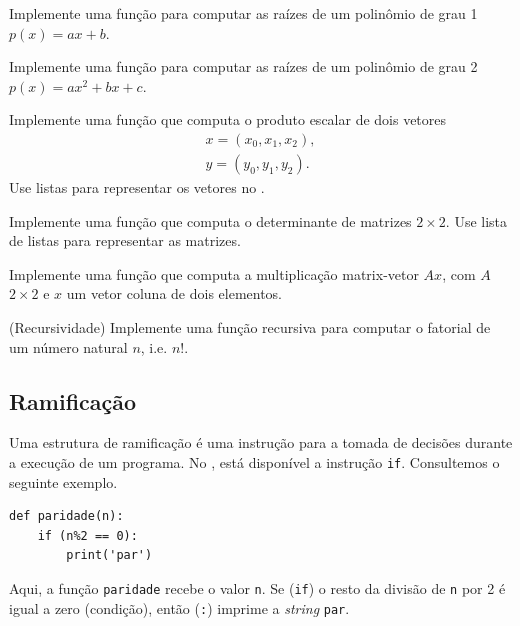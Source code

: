 \documentclass[12pt]{article}
\begin{document}
\begin{exr}
  Implemente uma função para computar as raízes de um polinômio de grau 1 $p(x) = ax + b$.
\end{exr}

\begin{exr}
  Implemente uma função para computar as raízes de um polinômio de grau 2 $p(x) = ax^2 + bx + c$.
\end{exr}

\begin{exr}
  Implemente uma função que computa o produto escalar de dois vetores
  \begin{gather}
    x = (x_0, x_1, x_2),\\
    y = (y_0, y_1, y_2).
  \end{gather}
  Use listas para representar os vetores no {\python}.
\end{exr}

\begin{exr}
  Implemente uma função que computa o determinante de matrizes $2\times 2$. Use lista de listas para representar as matrizes.
\end{exr}

\begin{exr}
  Implemente uma função que computa a multiplicação matrix-vetor $Ax$, com $A$ $2\times 2$ e $x$ um vetor coluna de dois elementos.
\end{exr}

\begin{exr}(Recursividade) Implemente uma função recursiva para computar o fatorial de um número natural $n$, i.e. $n!$.  
\end{exr}

\subsection{Ramificação}

Uma estrutura de ramificação é uma instrução para a tomada de decisões durante a execução de um programa. No {\python}, está disponível a instrução \lstinline+if+. Consultemos o seguinte exemplo.

\begin{lstlisting}
def paridade(n):
    if (n%2 == 0):
        print('par')
\end{lstlisting}

Aqui, a função \lstinline+paridade+ recebe o valor \lstinline+n+. Se (\lstinline+if+) o resto da divisão de \lstinline+n+ por 2 é igual a zero (condição), então (\lstinline+:+) imprime a {\it string} \lstinline+par+.
\end{document}
